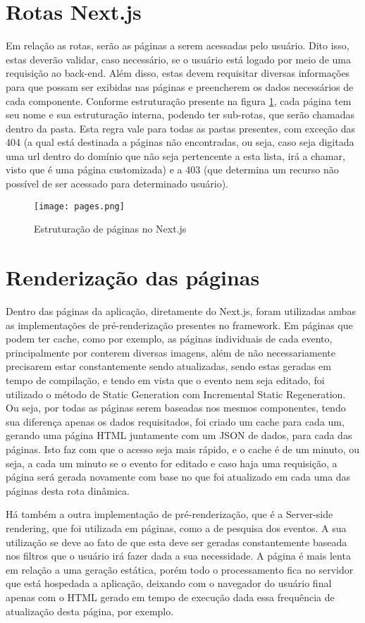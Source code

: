 \section{Rotas Next.js}
Em relação as rotas, serão as páginas a serem acessadas pelo usuário. Dito isso, estas deverão validar, caso necessário, se o usuário está logado por meio de uma requisição ao back-end. Além disso, estas devem requisitar diversas informações para que possam ser exibidas nas páginas e preencherem os dados necessários de cada componente. Conforme estruturação presente na figura \ref{pages}, cada página tem seu nome e sua estruturação interna, podendo ter sub-rotas, que serão chamadas dentro da pasta. Esta regra vale para todas as pastas presentes, com exceção das 404 (a qual está destinada a páginas não encontradas, ou seja, caso seja digitada uma url dentro do domínio que não seja pertencente a esta lista, irá a chamar, visto que é uma página customizada) e a 403 (que determina um recurso não possível de ser acessado para determinado usuário).
\begin{figure}[H]
    \caption{\label{pages}Estruturação de páginas no Next.js}
    \vspace{5pt}
    \centering
    \texttt{[image: pages.png]}
    \vspace{5pt}
\end{figure}

\section{Renderização das páginas}
Dentro das páginas da aplicação, diretamente do Next.js, foram utilizadas ambas as implementações de pré-renderização presentes no framework. Em páginas que podem ter cache, como por exemplo, as páginas individuais de cada evento, principalmente por conterem diversas imagens, além de não necessariamente precisarem estar constantemente sendo atualizadas, sendo estas geradas em tempo de compilação, e tendo em vista que o evento nem seja editado, foi utilizado o método de Static Generation com Incremental Static Regeneration. Ou seja, por todas as páginas serem baseadas nos mesmos componentes, tendo sua diferença apenas os dados requisitados, foi criado um cache para cada um, gerando uma página HTML juntamente com um JSON de dados, para cada das páginas. Isto faz com que o acesso seja mais rápido, e o cache é de um minuto, ou seja, a cada um minuto se o evento for editado e caso haja uma requisição, a página será gerada novamente com base no que foi atualizado em cada uma das páginas desta rota dinâmica.

Há também a outra implementação de pré-renderização, que é a Server-side rendering, que foi utilizada em páginas, como a de pesquisa dos eventos. A sua utilização se deve ao fato de que esta deve ser geradas constantemente baseada nos filtros que o usuário irá fazer dada a sua necessidade. A página é mais lenta em relação a uma geração estática, porém todo o processamento fica no servidor que está hospedada a aplicação, deixando com o navegador do usuário final apenas com o HTML gerado em tempo de execução dada essa frequência de atualização desta página, por exemplo.
